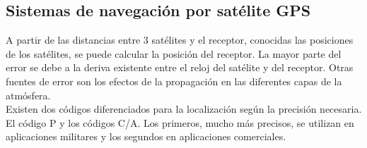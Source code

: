 	\subsection{Sistemas de navegación por satélite GPS}
\label{sub:gps}
	A partir de las distancias entre 3 satélites y el receptor, conocidas las posiciones de los satélites, se puede calcular la posición del receptor. La mayor parte del error se debe a la deriva existente entre el reloj del satélite y del receptor. Otras fuentes de error son los efectos de la propagación en las diferentes capas de la atmósfera.\\
	Existen dos códigos diferenciados para la localización según la precisión necesaria. El código P y los códigos C/A. Los primeros, mucho más precisos, se utilizan en aplicaciones militares y los segundos en aplicaciones comerciales.
